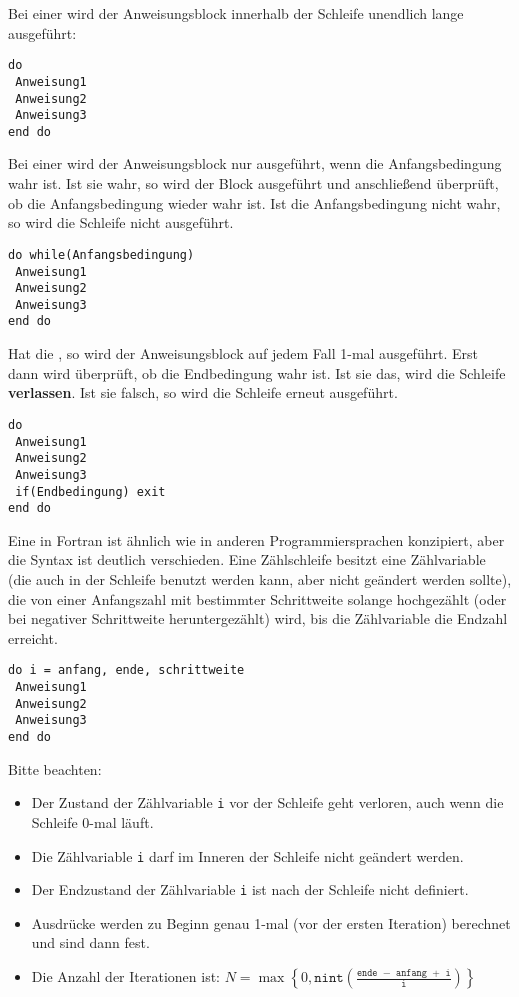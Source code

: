 Bei einer  wird der Anweisungsblock innerhalb der Schleife unendlich lange ausgeführt:
\begin{lstlisting}
do
 Anweisung1
 Anweisung2
 Anweisung3
end do
\end{lstlisting}

Bei einer  wird der Anweisungsblock nur ausgeführt, wenn die Anfangsbedingung wahr ist. Ist sie wahr, so wird der Block ausgeführt und anschließend überprüft, ob die Anfangsbedingung wieder wahr ist. Ist die Anfangsbedingung nicht wahr, so wird die Schleife nicht ausgeführt.
\begin{lstlisting}
do while(Anfangsbedingung)
 Anweisung1
 Anweisung2
 Anweisung3
end do
\end{lstlisting}

Hat die , so wird der Anweisungsblock auf jedem Fall 1-mal ausgeführt. Erst dann wird überprüft, ob die Endbedingung wahr ist. Ist sie das, wird die Schleife \textbf{verlassen}. Ist sie falsch, so wird die Schleife erneut ausgeführt.
\begin{lstlisting}
do
 Anweisung1
 Anweisung2
 Anweisung3
 if(Endbedingung) exit
end do
\end{lstlisting}

Eine  in Fortran ist ähnlich wie in anderen Programmiersprachen konzipiert, aber die Syntax ist deutlich verschieden. Eine Zählschleife besitzt eine Zählvariable (die auch in der Schleife benutzt werden kann, aber nicht geändert werden sollte), die von einer Anfangszahl mit bestimmter Schrittweite solange hochgezählt (oder bei negativer Schrittweite heruntergezählt) wird, bis die Zählvariable die Endzahl erreicht.
\begin{lstlisting}
do i = anfang, ende, schrittweite
 Anweisung1
 Anweisung2
 Anweisung3
end do
\end{lstlisting}

Bitte beachten:
\begin{itemize}
	\item Der Zustand der Zählvariable \texttt{i} vor der Schleife geht verloren, auch wenn die Schleife 0-mal läuft.
	\item Die Zählvariable \texttt{i} darf im Inneren der Schleife nicht geändert werden.
	\item Der Endzustand der Zählvariable \texttt{i} ist nach der Schleife nicht definiert.
	\item Ausdrücke werden zu Beginn genau 1-mal (vor der ersten Iteration) berechnet und sind dann fest.
	\item Die Anzahl der Iterationen ist: $N=\max\left\lbrace 0,\texttt{nint}\left(\frac{\texttt{ende }-\texttt{ anfang }+\texttt{ i}}{\texttt{i}}\right)\right\rbrace$
\end{itemize}

